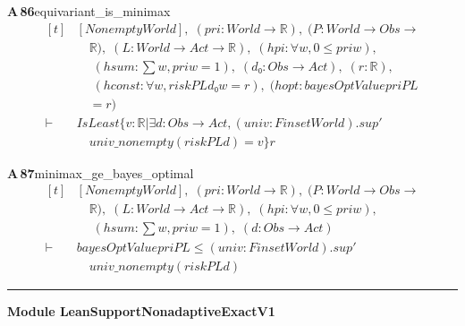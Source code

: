 \documentclass[conference]{IEEEtran}
\theoremstyle{definition}
\newcommand{\lean}[1]{\textsf{\footnotesize #1}}
\begin{document}
\noindent\textbf{A\,86}\quad\lean{equivariant\_is\_minimax}
{\footnotesize\[ \begin{aligned}[t]
&[\mathit{Nonempty} \mathit{World}],\; (\mathit{pri} : \mathit{World} \to \mathbb{R} ),\; (\mathit{P} : \mathit{World} \to \mathit{Obs} \to\\
&\quad \mathbb{R} ),\; (\mathit{L} : \mathit{World} \to \mathit{Act} \to \mathbb{R} ),\; (\mathit{hpi} : \forall \mathit{w}, 0 \leq \mathit{pri} \mathit{w}),\\
&\quad \; (\mathit{hsum} : \textstyle\sum \mathit{w}, \mathit{pri} \mathit{w} = 1),\; (\mathit{d₀} : \mathit{Obs} \to \mathit{Act}),\; (\mathit{r} : \mathbb{R} ),\\
&\quad \; (\mathit{hconst} : \forall \mathit{w}, \mathit{risk} \mathit{P} \mathit{L} \mathit{d₀} \mathit{w} = \mathit{r}),\; (\mathit{hopt} : \mathit{bayesOptValue} \mathit{pri} \mathit{P} \mathit{L}\\
&\quad = \mathit{r})\\
\vdash\;&\mathit{IsLeast} \{ \mathit{v} : \mathbb{R} | \exists \mathit{d} : \mathit{Obs} \to \mathit{Act}, (\mathit{univ} : \mathit{Finset} \mathit{World}).\mathit{sup'}\\
&\quad \mathit{univ\_nonempty} (\mathit{risk} \mathit{P} \mathit{L} \mathit{d}) = \mathit{v}\} \mathit{r}
\end{aligned} \]}

\noindent\textbf{A\,87}\quad\lean{minimax\_ge\_bayes\_optimal}
{\footnotesize\[ \begin{aligned}[t]
&[\mathit{Nonempty} \mathit{World}],\; (\mathit{pri} : \mathit{World} \to \mathbb{R} ),\; (\mathit{P} : \mathit{World} \to \mathit{Obs} \to\\
&\quad \mathbb{R} ),\; (\mathit{L} : \mathit{World} \to \mathit{Act} \to \mathbb{R} ),\; (\mathit{hpi} : \forall \mathit{w}, 0 \leq \mathit{pri} \mathit{w}),\\
&\quad \; (\mathit{hsum} : \textstyle\sum \mathit{w}, \mathit{pri} \mathit{w} = 1),\; (\mathit{d} : \mathit{Obs} \to \mathit{Act})\\
\vdash\;&\mathit{bayesOptValue} \mathit{pri} \mathit{P} \mathit{L} \leq (\mathit{univ} : \mathit{Finset} \mathit{World}).\mathit{sup'}\\
&\quad \mathit{univ\_nonempty} (\mathit{risk} \mathit{P} \mathit{L} \mathit{d})
\end{aligned} \]}

\vspace{4pt}\noindent\rule{\columnwidth}{0.4pt}\par\vspace{2pt}
\noindent\textbf{Module \lean{LeanSupportNonadaptiveExactV1}}\par\vspace{3pt}
\end{document}
